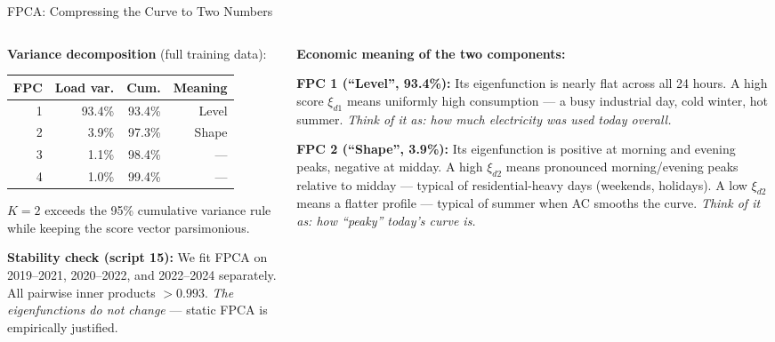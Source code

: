 \documentclass[10pt,aspectratio=169]{beamer}
\begin{document}
\begin{frame}{FPCA: Compressing the Curve to Two Numbers}

  \begin{columns}
  \begin{column}{0.46\textwidth}
    \textbf{Variance decomposition} (full training data):
    \vspace{0.3em}
    \begin{center}
    \small
    \begin{tabular}{rrrr}
      \toprule
      FPC & Load var. & Cum. & Meaning \\
      \midrule
      1 & 93.4\% & 93.4\% & Level \\
      2 &  3.9\% & 97.3\% & Shape \\
      3 &  1.1\% & 98.4\% & --- \\
      4 &  1.0\% & 99.4\% & --- \\
      \bottomrule
    \end{tabular}
    \end{center}
    \vspace{0.3em}
    $K=2$ exceeds the 95\% cumulative variance rule
    while keeping the score vector parsimonious.

    \vspace{0.5em}
    \textbf{Stability check (script 15):}
    We fit FPCA on 2019--2021, 2020--2022, and 2022--2024 separately.
    All pairwise inner products $> 0.993$.
    \emph{The eigenfunctions do not change} --- static FPCA is
    empirically justified.
  \end{column}
  \begin{column}{0.5\textwidth}
    \textbf{Economic meaning of the two components:}

    \vspace{0.5em}
    \textbf{FPC 1 (``Level'', 93.4\%):}
    Its eigenfunction is nearly flat across all 24 hours.
    A high score $\xi_{d1}$ means uniformly high consumption ---
    a busy industrial day, cold winter, hot summer.
    \emph{Think of it as: how much electricity was used today overall.}

    \vspace{0.5em}
    \textbf{FPC 2 (``Shape'', 3.9\%):}
    Its eigenfunction is positive at morning and evening peaks,
    negative at midday.
    A high $\xi_{d2}$ means pronounced morning/evening peaks relative
    to midday --- typical of residential-heavy days (weekends, holidays).
    A low $\xi_{d2}$ means a flatter profile --- typical of summer
    when AC smooths the curve.
    \emph{Think of it as: how ``peaky'' today's curve is.}
  \end{column}
  \end{columns}
\end{frame}
\end{document}
